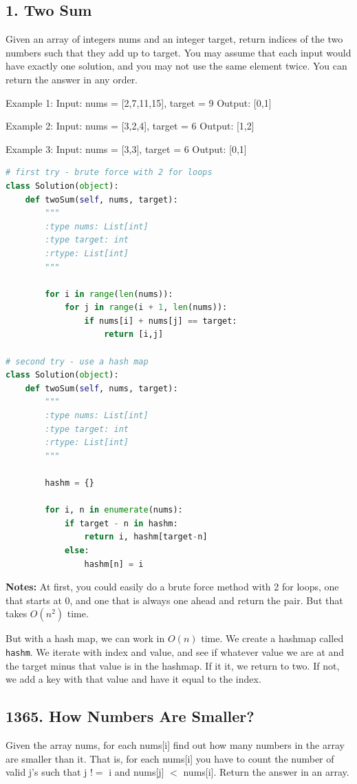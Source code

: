 \documentclass[11pt]{article}
\begin{document}
\subsection*{1. Two Sum}
Given an array of integers nums and an integer target, return indices of the two numbers such that they add up to target.
You may assume that each input would have exactly one solution, and you may not use the same element twice.
You can return the answer in any order.

 
Example 1:
Input: nums = [2,7,11,15], target = 9
Output: [0,1]

Example 2:
Input: nums = [3,2,4], target = 6
Output: [1,2]

Example 3:
Input: nums = [3,3], target = 6
Output: [0,1]

\begin{lstlisting}[language=python, mathescape=true]
# first try - brute force with 2 for loops
class Solution(object):
    def twoSum(self, nums, target):
        """
        :type nums: List[int]
        :type target: int
        :rtype: List[int]
        """

        for i in range(len(nums)):
            for j in range(i + 1, len(nums)):
                if nums[i] + nums[j] == target:
                    return [i,j]

# second try - use a hash map
class Solution(object):
    def twoSum(self, nums, target):
        """
        :type nums: List[int]
        :type target: int
        :rtype: List[int]
        """

        hashm = {}

        for i, n in enumerate(nums):
            if target - n in hashm:
                return i, hashm[target-n]
            else:
                hashm[n] = i
\end{lstlisting}

\noindent \textbf{Notes:} At first, you could easily do a brute force method with 2 for loops, one that starts at 0, and one that is always one ahead and return the pair. But that takes $O(n^2)$ time.

\noindent But with a hash map, we can work in $O(n)$ time. We create a hashmap called \texttt{hashm}. We iterate with index and value, and see if whatever value we are at and the target minus that value is in the hashmap. If it it, we return to two. If not, we add a key with that value and have it equal to the index.

\subsection*{1365. How Numbers Are Smaller?}
Given the array nums, for each nums[i] find out how many numbers in the array are smaller than it. That is, for each nums[i] you have to count the number of valid j's such that j $!=$ i and nums[j] $<$ nums[i]. Return the answer in an array.
\end{document}

